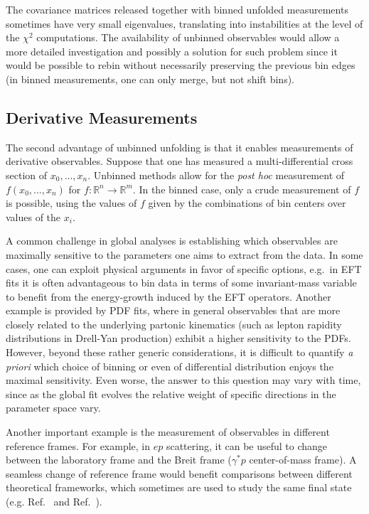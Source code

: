 \documentclass[a4paper,11pt]{article}
\begin{document}
The covariance matrices released together with binned unfolded measurements sometimes have very small eigenvalues, translating into instabilities at the level of the $\chi^2$ computations.
The availability of unbinned observables would allow a more detailed investigation and possibly a solution for such problem since it would be possible to rebin without necessarily preserving the previous bin edges (in binned measurements, one can only merge, but not shift bins).

\subsection{Derivative Measurements}

The second advantage of unbinned unfolding is that it enables measurements of derivative observables.  Suppose that one has measured a multi-differential cross section of $x_0, ...,x_n$.  Unbinned methods allow for the \textit{post hoc} measurement of $f(x_0,...,x_n)$ for $f:\mathbb{R}^n\rightarrow\mathbb{R}^m$.  In the binned case, only a crude measurement of $f$ is possible, using the values of $f$ given by the combinations of bin centers over values of the $x_i$.  

A common challenge in global analyses is establishing which observables are maximally sensitive to the parameters one aims to extract from the data. 
	In some cases, one can exploit physical
	arguments in favor of specific options, e.g.\ in EFT fits
	it is often advantageous to bin data in terms
	of some invariant-mass variable to benefit from the energy-growth induced by the EFT operators. 
	Another example is provided by PDF fits, where in general observables that are more closely related to the underlying partonic kinematics (such as lepton rapidity distributions in Drell-Yan production) exhibit a higher sensitivity to the PDFs. 
	However, beyond these rather generic considerations, it is difficult to quantify {\it a priori} which choice of binning or even of differential distribution enjoys the maximal sensitivity.
	Even worse, the answer to this question may vary with time, since as the global fit evolves the relative weight of specific directions in the parameter space vary.

Another important example is the measurement of observables in different reference frames.  For example, in $ep$ scattering, it can be useful to change between the laboratory frame and the Breit frame ($\gamma^*p$ center-of-mass frame).   A seamless change of reference frame would benefit comparisons between different theoretical frameworks, which sometimes are used to study the same final state (e.g. Ref.~\cite{Liu:2018trl} and Ref.~\cite{Gutierrez-Reyes:2018qez}). 
\end{document}
